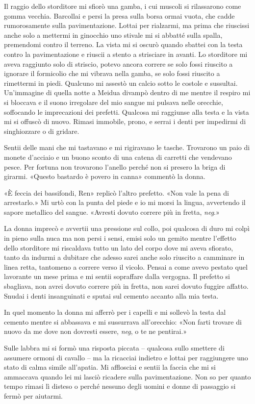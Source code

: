 Il raggio dello storditore mi sfiorò una gamba, i cui muscoli si
rilassarono come gomma vecchia. Barcollai e persi la presa sulla borsa
ormai vuota, che cadde rumorosamente sulla pavimentazione. Lottai per
rialzarmi, ma prima che riuscissi anche solo a mettermi in ginocchio uno
stivale mi si abbatté sulla spalla, premendomi contro il terreno. La
vista mi si oscurò quando sbattei con la testa contro la pavimentazione
e riuscii a stento a strisciare in avanti. Lo storditore mi aveva
raggiunto solo di striscio, potevo ancora correre se solo fossi riuscito
a ignorare il formicolio che mi vibrava nella gamba, se solo fossi
riuscito a rimettermi in piedi. Qualcuno mi assestò un calcio sotto le
costole e sussultai. Un'immagine di quella notte a Meidua divampò dentro
di me mentre il respiro mi si bloccava e il suono irregolare del mio
sangue mi pulsava nelle orecchie, soffocando le imprecazioni dei
prefetti. Qualcosa mi raggiunse alla testa e la vista mi si offuscò di
nuovo. Rimasi immobile, prono, e serrai i denti per impedirmi di
singhiozzare o di gridare.

Sentii delle mani che mi tastavano e mi rigiravano le tasche. Trovarono
un paio di monete d'acciaio e un buono sconto di una catena di carretti
che vendevano pesce. Per fortuna non trovarono l'anello perché non si
presero la briga di girarmi. «Questo bastardo è povero in canna»
commentò la donna.

«È feccia dei bassifondi, Ren» replicò l'altro prefetto. «Non vale la
pena di arrestarlo.» Mi urtò con la punta del piede e io mi morsi la
lingua, avvertendo il sapore metallico del sangue. «Avresti dovuto
correre più in fretta, \emph{neg}.»

La donna imprecò e avvertii una pressione sul collo, poi qualcosa di
duro mi colpì in pieno sulla nuca ma non persi i sensi, emisi solo un
gemito mentre l'effetto dello storditore mi riscaldava tutto un lato del
corpo dove mi aveva sfiorato, tanto da indurmi a dubitare che adesso
sarei anche solo riuscito a camminare in linea retta, tantomeno a
correre verso il vicolo. Pensai a come avevo pestato quel lavorante un
mese prima e mi sentii sopraffare dalla vergogna. Il prefetto si
sbagliava, non avrei dovuto correre più in fretta, non sarei dovuto
fuggire affatto. Snudai i denti insanguinati e sputai sul cemento
accanto alla mia testa.

In quel momento la donna mi afferrò per i capelli e mi sollevò la testa
dal cemento mentre si abbassava e mi sussurrava all'orecchio: «Non farti
trovare di nuovo da me dove non dovresti essere, \emph{neg}, o te ne
pentirai.»

Sulle labbra mi si formò una risposta piccata -- qualcosa sullo smettere
di assumere ormoni di cavallo -- ma la ricacciai indietro e lottai per
raggiungere uno stato di calma simile all'apatia. Mi afflosciai e sentii
la faccia che mi si ammaccava quando lei mi lasciò ricadere sulla
pavimentazione. Non so per quanto tempo rimasi lì disteso o perché
nessuno degli uomini e donne di passaggio si fermò per aiutarmi.


